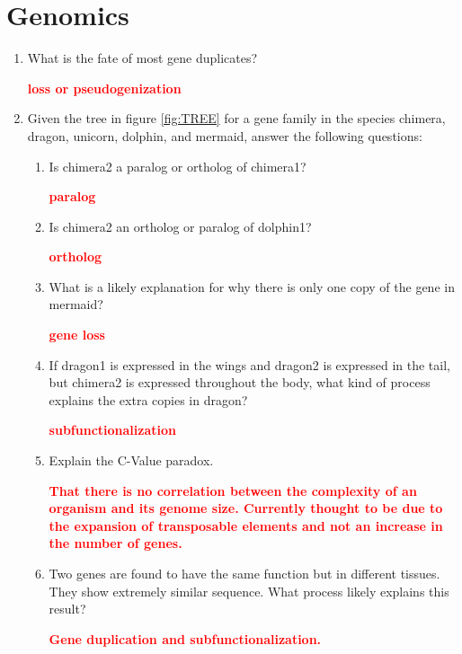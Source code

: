 \documentclass[]{article}
\newcommand{\answer}[1]{\textcolor{red}{\bf #1}}
\begin{document}
\section*{Genomics}
\begin{enumerate}
\item  What is the fate of most gene duplicates?

\answer{loss or pseudogenization}

\item Given the tree in figure \ref{fig:TREE} for a gene family in the species chimera, dragon, unicorn, dolphin, and mermaid, answer the following questions:
\begin{enumerate}
\item Is chimera2 a paralog or ortholog of chimera1?

\answer{paralog}
\item Is chimera2 an ortholog or paralog of dolphin1?

\answer{ortholog}
\item What is a likely explanation for why there is only one copy of the gene in mermaid?

\answer{gene loss}
\item If dragon1 is expressed in the wings and dragon2 is expressed in the tail, but chimera2 is expressed throughout the body, what kind of process explains the extra copies in dragon?

\answer{subfunctionalization}
 \item Explain the C-Value paradox.

\answer{That there is no correlation between the complexity of an organism and its genome size. Currently thought to be due to the expansion of transposable elements and not an increase in the number of genes.}
\item Two genes are found to have the same function but in different tissues. They show extremely similar sequence. What process likely explains this result?

\answer{ Gene duplication and subfunctionalization.}
\end{enumerate}


\end{enumerate}
\end{document}
